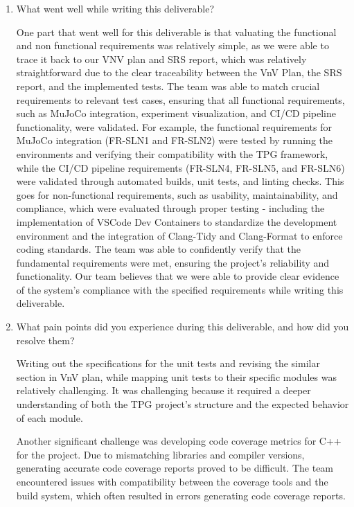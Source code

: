 \documentclass[12pt, titlepage]{article}
\begin{document}
\begin{enumerate}
  \item What went well while writing this deliverable? 

  One part that went well for this deliverable is that valuating the functional and non functional requirements was relatively simple, as we were able to trace it back to our VNV plan and SRS report, which was relatively straightforward due to the clear traceability between the VnV Plan, the SRS report, and the implemented tests. The team was able to match crucial requirements to relevant test cases, ensuring that all functional requirements, such as MuJoCo integration, experiment visualization, and CI/CD pipeline functionality, were validated. For example, the functional requirements for MuJoCo integration (FR-SLN1 and FR-SLN2) were tested by running the environments and verifying their compatibility with the TPG framework, while the CI/CD pipeline requirements (FR-SLN4, FR-SLN5, and FR-SLN6) were validated through automated builds, unit tests, and linting checks. This goes for non-functional requirements, such as usability, maintainability, and compliance, which were evaluated through proper testing - including the implementation of VSCode Dev Containers to standardize the development environment and the integration of Clang-Tidy and Clang-Format to enforce coding standards. The team was able to confidently verify that the fundamental requirements were met, ensuring the project's reliability and functionality. Our team believes that we were able to provide clear evidence of the system's compliance with the specified requirements while writing this deliverable.


  \item What pain points did you experience during this deliverable, and how
    did you resolve them?

    Writing out the specifications for the unit tests and revising the similar section in VnV plan, while mapping unit tests to their specific modules was relatively challenging. It was challenging because it required a deeper understanding of both the TPG project's structure and the expected behavior of each module. 

    Another significant challenge was developing code coverage metrics for C++ for the project. Due to mismatching libraries and compiler versions, generating accurate code coverage reports proved to be difficult. The team encountered issues with compatibility between the coverage tools and the build system, which often resulted in errors generating code coverage reports.


\end{enumerate}
\end{document}
